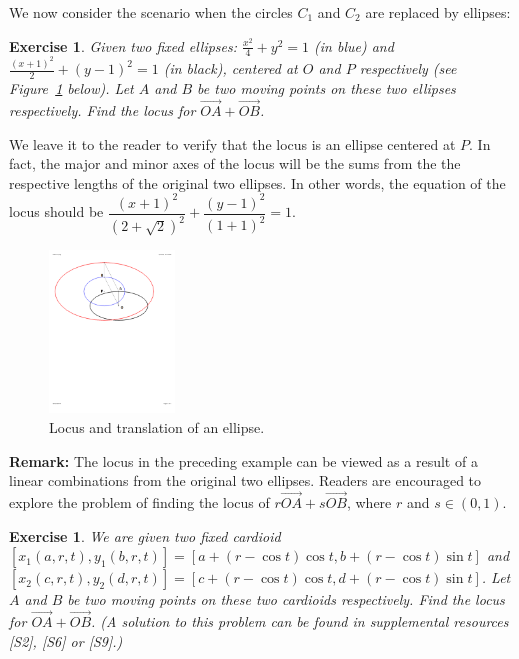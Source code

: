 \documentclass[12pt,a4paper]{article}%
\newtheorem{exercise}[theorem]{Exercise}
\begin{document}
We now consider the scenario when the circles $C_1$ and $C_2$ are replaced by ellipses:

\begin{exercise} \label{ex5}
Given two fixed ellipses: $\frac{x^{2}}{4}+y^{2}=1$ (in blue) and
$\frac{\left(  x+1\right)  ^{2}}{2}+(y-1)^{2}=1$ (in black), centered at $O$
and $P$ respectively (see Figure~\ref{fig7} below). Let $A$ and $B$ be two moving points
on these two ellipses respectively. Find the locus for
$\overrightarrow{OA}+\overrightarrow{OB}$.
\end{exercise}

We leave it to the reader to verify that the locus is an ellipse centered at
$P$. In fact, the major and minor axes of the locus will be the sums
from the the respective lengths of the original two ellipses. In other
words, the equation of the locus should be
$\dfrac{\left(  x+1\right)^{2}}{\left(  2+\sqrt{2}\right)^{2}}+\dfrac{(y-1)^{2}}{(1+1)^2}=1$.

\begin{figure}[htbp]
\begin{center}
\includegraphics[height=1.7in,trim=0mm 120mm 35mm 15mm,clip,keepaspectratio]{eJMT-1.pdf}
\end{center}
 \caption{Locus and translation of an ellipse.}
 \label{fig7}
\end{figure}

\textbf{Remark:}
The locus in the preceding example can be viewed as a result of a
linear combinations from the original two ellipses.
Readers are encouraged to explore the problem of finding the locus of
$r\overrightarrow{OA}+s\overrightarrow{OB}$, where $r$ and $s\in(0,1)$.

\begin{exercise} \label{ex6}
We are given two fixed cardioid $[x_{1}(a,r,t),y_{1}(b,r,t)]=[a+(r-\cos t)\cos
t,b+(r-\cos t)\sin t]$ and $[x_{2}(c,r,t),y_{2}(d,r,t)]=[c+(r-\cos t)\cos
t,d+(r-\cos t)\sin t]$. Let $A$ and $B$ be two moving points on these two
cardioids respectively. Find the locus for $\overrightarrow{OA}%
+\overrightarrow{OB}$.
(A solution to this problem can be found in supplemental resources [S2], [S6] or [S9].)
\end{exercise}
\end{document}
